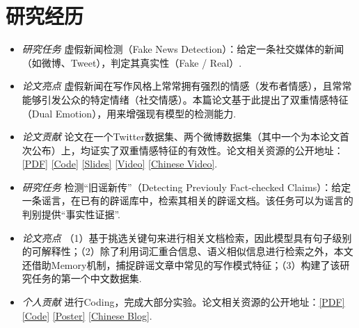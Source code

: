 \documentclass{resume}
\begin{document}
\section{研究经历}
{\small {}
}
\small
\begin{itemize}
  \item \textit{研究任务} \quad 虚假新闻检测（Fake News Detection）：给定一条社交媒体的新闻（如微博、Tweet），判定其真实性（Fake / Real）.
  \item \textit{论文亮点} \quad 虚假新闻在写作风格上常常拥有强烈的情感（发布者情感），且常常能够引发公众的特定情绪（社交情感）。本篇论文基于此提出了双重情感特征（Dual Emotion），用来增强现有模型的检测能力.
  \item \textit{论文贡献} \quad 论文在一个Twitter数据集、两个微博数据集（其中一个为本论文首次公布）上，均证实了双重情感特征的有效性。论文相关资源的公开地址：\href{https://www.zhangxueyao.com/assets/www2021-dual-emotion-paper.pdf}{[PDF]} \href{https://github.com/RMSnow/WWW2021}{[Code]} \href{https://www.zhangxueyao.com/assets/www2021-dual-emotion-slides.pdf}{[Slides]} \href{https://www.zhangxueyao.com/assets/www2021-dual-emotion-video.mp4}{[Video]} \href{https://www.bilibili.com/video/BV13o4y1m7c3}{[Chinese Video]}.
\end{itemize}

{\small {}}
\small
\begin{itemize}
  \item \textit{研究任务} \quad 检测“旧谣新传”（Detecting Previouly Fact-checked Claims）：给定一条谣言，在已有的辟谣库中，检索其相关的辟谣文档。该任务可以为谣言的判别提供“事实性证据”.
  \item \textit{论文亮点} \quad （1）基于挑选关键句来进行相关文档检索，因此模型具有句子级别的可解释性；（2）除了利用词汇重合信息、语义相似信息进行检索之外，本文还借助Memory机制，捕捉辟谣文章中常见的写作模式特征；（3）构建了该研究任务的第一个中文数据集.
  \item \textit{个人贡献} \quad 进行Coding，完成大部分实验。论文相关资源的公开地址：\href{https://aclanthology.org/2021.acl-long.425.pdf}{[PDF]} \href{https://github.com/ICTMCG/MTM}{[Code]} \href{https://www.zhangxueyao.com/data/acl2021-MTM-poster.pdf}{[Poster]} \href{https://zhuanlan.zhihu.com/p/393615707}{[Chinese Blog]}.
\end{itemize}
\end{document}
